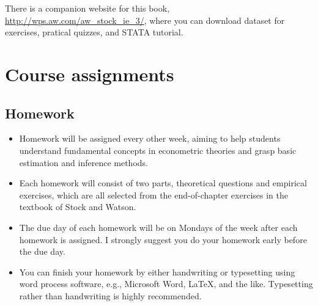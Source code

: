 \documentclass[a4paper,11pt]{article}
\begin{document}
There is a companion website for this book,
\url{http://wps.aw.com/aw\_stock\_ie\_3/}, where you can download dataset for
exercises, pratical quizzes, and STATA tutorial. 

\section{Course assignments}
\label{sec:orgdf21105}
\subsection*{Homework}
\label{sec:org5e12ea0}

\begin{itemize}
\item Homework will be assigned every other week, aiming to help students
understand fundamental concepts in econometric theories and grasp
basic estimation and inference methods.

\item Each homework will consist of two parts, theoretical questions and
empirical exercises, which are all selected from the end-of-chapter
exercises in the textbook of Stock and Watson.

\item The due day of each homework will be on Mondays of the week after
each homework is assigned. I strongly suggest you do your homework
early before the due day.

\item You can finish your homework by either handwriting or typesetting
using word process software, e.g., Microsoft Word, \LaTeX{}, and the
like. Typesetting rather than handwriting is highly recommended.


\end{itemize}
\end{document}

